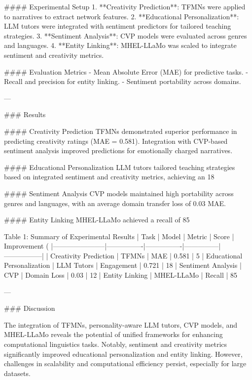 #### Experimental Setup
1. **Creativity Prediction**: TFMNs were applied to narratives to extract network features.
2. **Educational Personalization**: LLM tutors were integrated with sentiment predictors for tailored teaching strategies.
3. **Sentiment Analysis**: CVP models were evaluated across genres and languages.
4. **Entity Linking**: MHEL-LLaMo was scaled to integrate sentiment and creativity metrics.

#### Evaluation Metrics
- Mean Absolute Error (MAE) for predictive tasks.
- Recall and precision for entity linking.
- Sentiment portability across domains.

---

### Results

#### Creativity Prediction
TFMNs demonstrated superior performance in predicting creativity ratings (MAE = 0.581). Integration with CVP-based sentiment analysis improved predictions for emotionally charged narratives.

#### Educational Personalization
LLM tutors tailored teaching strategies based on integrated sentiment and creativity metrics, achieving an 18%

#### Sentiment Analysis
CVP models maintained high portability across genres and languages, with an average domain transfer loss of 0.03 MAE.

#### Entity Linking
MHEL-LLaMo achieved a recall of 85%

Table 1: Summary of Experimental Results  
| Task                  | Model          | Metric         | Score         | Improvement (%
|-----------------------|----------------|----------------|---------------|-----------------|
| Creativity Prediction | TFMNs          | MAE            | 0.581         | 5%
| Educational Personalization | LLM Tutors | Engagement     | 0.721         | 18%
| Sentiment Analysis    | CVP            | Domain Loss    | 0.03          | 12%
| Entity Linking        | MHEL-LLaMo     | Recall         | 85%

---

### Discussion

The integration of TFMNs, personality-aware LLM tutors, CVP models, and MHEL-LLaMo reveals the potential of unified frameworks for enhancing computational linguistics tasks. Notably, sentiment and creativity metrics significantly improved educational personalization and entity linking. However, challenges in scalability and computational efficiency persist, especially for large datasets.

